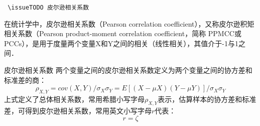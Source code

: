 
\verb | \issueTODO 皮尔逊相关系数|

在统计学中，皮尔逊相关系数（Pearson correlation coefficient），又称皮尔逊积矩相关系数（Pearson product-moment correlation coefficient，简称 PPMCC或PCCs），是用于度量两个变量X和Y之间的相关（线性相关），其值介于-1与1之间．
\begin{definition}{皮尔逊相关系数}\label{PearsR_def1}
两个变量之间的皮尔逊相关系数定义为两个变量之间的协方差和标准差的商：
\begin{equation}
\rho_{X,Y}=cov(X,Y)/\sigma_{X}\sigma_{Y}=E[(X-\mu X)(Y-\mu Y)]/\sigma_{X}\sigma_{Y}
\end{equation}
上式定义了总体相关系数，常用希腊小写字母$\rho_{X,Y}$表示，估算样本的协方差和标准差，可得到皮尔逊相关系数，常用英文小写字母$r$代表：
\begin{equation}
r=\zeta
\end{equation}
\end{definition}